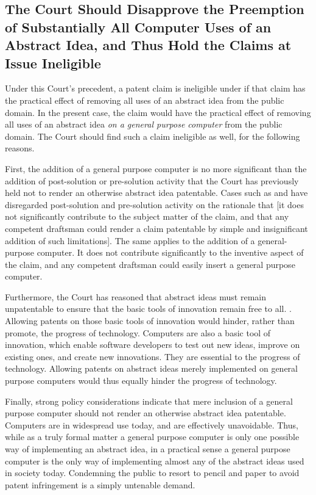 \documentclass{scotus}
\begin{document}
\subsection{The Court Should Disapprove the Preemption of Substantially All
Computer Uses of an Abstract Idea, and Thus Hold the Claims at Issue Ineligible}

Under this Court's precedent, a patent claim is ineligible under  if
that claim has the practical effect of removing all uses of an abstract idea
from the public domain. In the present case, the claim would have the practical
effect of removing all uses of an abstract idea \emph{on a general purpose
computer} from the public domain. The Court should find such a claim ineligible
as well, for the following reasons.

First, the addition of a general purpose computer is no more significant than
the addition of post-solution or pre-solution activity that the Court has
previously held not to render an otherwise abstract idea patentable. Cases such
as  and  have disregarded post-solution and
pre-solution activity on the rationale that
%
[it does not significantly contribute to the subject matter of the claim, and
that any competent draftsman could render a claim patentable by simple and
insignificant addition of such limitations].
The same applies to the addition of a general-purpose computer. It does not
contribute significantly to the inventive aspect of the claim, and any competent
draftsman could easily insert a general purpose computer.

Furthermore, the Court has reasoned that abstract ideas must remain unpatentable
to ensure that the basic tools of innovation remain free to all. . Allowing patents on those basic tools of innovation would
hinder, rather than promote, the progress of technology. Computers are also a
basic tool of innovation, which enable software developers to test out new
ideas, improve on existing ones, and create new innovations. They are essential
to the progress of technology.  Allowing patents on abstract ideas merely
implemented on general purpose computers would thus equally hinder the progress
of technology.

Finally, strong policy considerations indicate that mere inclusion of a general
purpose computer should not render an otherwise abstract idea patentable.
Computers are in widespread use today, and are effectively unavoidable. Thus,
while as a truly formal matter a general purpose computer is only one possible
way of implementing an abstract idea, in a practical sense a general purpose
computer is the only way of implementing almost any of the abstract ideas used
in society today. Condemning the public to resort to pencil and paper to avoid
patent infringement is a simply untenable demand.
\end{document}
